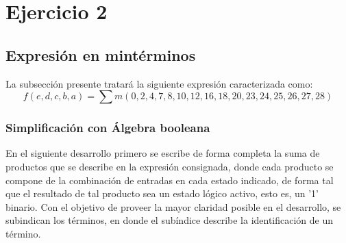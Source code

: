 \section{Ejercicio 2}

\newcommand{\subindex}[1]{_{\ \ \color{red} #1}}

\subsection{Expresi\'on en mint\'erminos}
La subsecci\'on presente tratar\'a la siguiente expresi\'on caracterizada como:
\begin{equation*}
    f(e,d,c,b,a) = \sum m(0,2,4,7,8,10,12,16,18,20,23,24,25,26,27,28)
\end{equation*}


\subsubsection{Simplificación con Álgebra booleana}
En el siguiente desarrollo primero se escribe de forma completa la suma de productos que se describe en la expresi\'on
consignada, donde cada producto se compone de la combinaci\'on de entradas en cada estado indicado, de forma tal que el resultado 
de tal producto sea un estado l\'ogico activo, esto es, un '1' binario. Con el objetivo de proveer la mayor claridad posible en el desarrollo,
se subindican los t\'erminos, en donde el sub\'indice describe la identificaci\'on de un t\'ermino.

